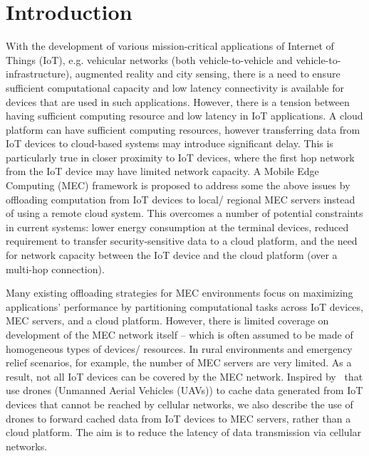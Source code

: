 \section{Introduction}
\label{sec:introduction}

With the development of various mission-critical applications of Internet of Things (IoT), e.g. vehicular networks (both vehicle-to-vehicle and vehicle-to-infrastructure), augmented reality and city sensing, there is a need to ensure sufficient computational capacity and low latency connectivity is available for devices that are used in such applications. However, there is a tension between having sufficient computing resource and low latency in IoT applications. A cloud platform can have sufficient computing resources, however transferring data from IoT devices to cloud-based systems may introduce significant delay. This is particularly true in closer proximity to IoT devices, where the first hop network from the IoT device may have limited network capacity. A Mobile Edge Computing (MEC) framework is proposed to address some the above issues by offloading computation from IoT devices to local/ regional MEC servers instead of using a remote cloud system. This overcomes a number of potential constraints in current systems: lower energy consumption at the terminal devices\cite{mach2017mobile}, reduced requirement to transfer security-sensitive data to a cloud platform, and the need for network capacity between the IoT device and the cloud platform (over a multi-hop connection). 

Many existing offloading strategies for MEC environments focus on maximizing applications' performance by partitioning computational tasks across  IoT devices, MEC servers, and a cloud platform. However, there is limited coverage on development of the MEC network itself -- which is often assumed to be made of homogeneous types of devices/ resources. In rural environments and emergency relief scenarios, for example, the number of MEC servers are very limited. As a result, not all IoT devices can be covered by the MEC network. Inspired by~\cite{chen2017caching,zeng2016wireless,jeong2017mobile} that use drones (Unmanned Aerial Vehicles (UAVs)) to cache data generated from IoT devices that cannot be reached by cellular networks, we also describe the use of drones to forward cached data from IoT devices to MEC servers, rather than a  cloud platform.  The aim is to reduce the latency of data transmission via cellular networks.  

